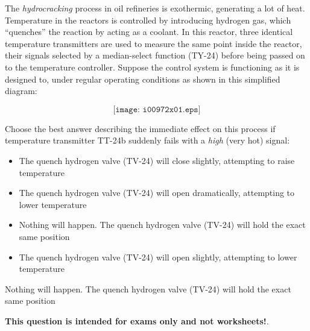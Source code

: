 

The {\it hydrocracking} process in oil refineries is exothermic, generating a lot of heat.  Temperature in the reactors is controlled by introducing hydrogen gas, which ``quenches'' the reaction by acting as a coolant.  In this reactor, three identical temperature transmitters are used to measure the same point inside the reactor, their signals selected by a median-select function (TY-24) before being passed on to the temperature controller.  Suppose the control system is functioning as it is designed to, under regular operating conditions as shown in this simplified diagram:

$$\texttt{[image: i00972x01.eps]}$$

\noindent
Choose the best answer describing the immediate effect on this process if temperature transmitter TT-24b suddenly fails with a {\it high} (very hot) signal:

\begin{itemize}
\item{} The quench hydrogen valve (TV-24) will close slightly, attempting to raise temperature
\vskip 10pt
\item{} The quench hydrogen valve (TV-24) will open dramatically, attempting to lower temperature
\vskip 10pt
\item{} Nothing will happen.  The quench hydrogen valve (TV-24) will hold the exact same position
\vskip 10pt
\item{} The quench hydrogen valve (TV-24) will open slightly, attempting to lower temperature 
\end{itemize}








Nothing will happen.  The quench hydrogen valve (TV-24) will hold the exact same position
 






{\bf This question is intended for exams only and not worksheets!}.



